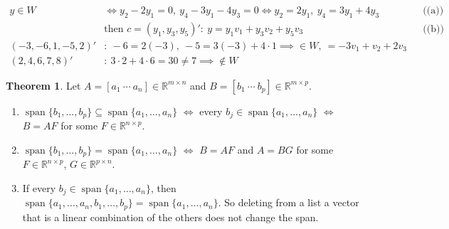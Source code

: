 \documentclass[12pt]{article}
\newcommand{\R}{\mathbb R}
\DeclareMathOperator{\Span}{span}
\theoremstyle{definition}
\newtheorem{theorem}{Theorem}
\newcommand{\boardtop}{\vspace*{-\abovedisplayskip}}
\begin{document}
\begin{board}[\lec{2}, \lit{Proposition~7} with the unknowns \(c_1,c_2,c_3\), \(r=3\), no free unknowns (so
\(c_{k_i}=z_i\)):]
\boardtop
\begin{align*}
y\in W&\iff y_2-2y_1=0,\ y_4-3y_1-4y_3=0\iff y_2=2y_1,\ y_4=3y_1+4y_3&&\text{((a))}\\
&\text{then }c=(y_1,y_3,y_5)':\ y=y_1v_1+y_3v_2+y_5v_3&&\text{((b))}\\
(-3,-6,1,-5,2)'&:\ -6=2(-3),\ -5=3(-3)+4\cdot1\implies\in W,\ =-3v_1+v_2+2v_3\\
(2,4,6,7,8)'&:\ 3\cdot2+4\cdot6=30\ne7\implies\notin W
\end{align*}
\end{board}

\begin{theorem}\label{b3.10}
Let \(A=[a_1\ \cdots\ a_n]\in\R^{m\times n}\) and \(B=[b_1\ \cdots\ b_p]\in\R^{m\times p}\).
\begin{enumerate}
\item \(\Span\{b_1,\dots,b_p\}\subseteq\Span\{a_1,\dots,a_n\}\) \(\iff\) every \(b_j\in\Span\{a_1,\dots,a_n\}\)
\(\iff\) \(B=AF\) for some \(F\in\R^{n\times p}\).
\item \(\Span\{b_1,\dots,b_p\}=\Span\{a_1,\dots,a_n\}\) \(\iff\) \(B=AF\) and \(A=BG\) for some \(F\in\R^{n\times p}\),
\(G\in\R^{p\times n}\).
\item If every \(b_j\in\Span\{a_1,\dots,a_n\}\), then \(\Span\{a_1,\dots,a_n,b_1,\dots,b_p\}=\Span\{a_1,\dots,a_n\}\). So
deleting from a list a vector that is a linear combination of the others does not change the span.
\end{enumerate}
\end{theorem}
\end{document}
